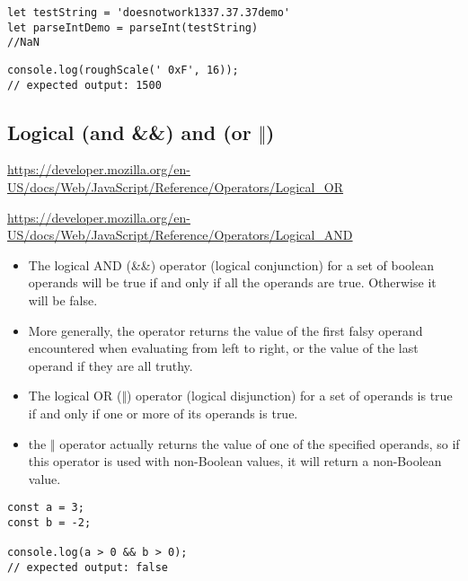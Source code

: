 \documentclass[10pt]{article}
\begin{document}
\begin{lstlisting}[title=Example parseInt() without numbers at start, captionpos=t]
let testString = 'doesnotwork1337.37.37demo'
let parseIntDemo = parseInt(testString)
//NaN
\end{lstlisting}

\begin{lstlisting}[title=Example parseInt() with radix 16, captionpos=t]
console.log(roughScale(' 0xF', 16));
// expected output: 1500
\end{lstlisting}

\medskip %



\medskip %
\pagebreak
\subsection{Logical (and \&\&) and (or	$\Vert$) }

\url{https://developer.mozilla.org/en-US/docs/Web/JavaScript/Reference/Operators/Logical_OR}

\medskip

\url{https://developer.mozilla.org/en-US/docs/Web/JavaScript/Reference/Operators/Logical_AND}


\begin{itemize}
	\item The logical AND (\&\&) operator (logical conjunction) for a set of boolean operands will be true if and only if all the operands are true. Otherwise it will be false.
	\item More generally, the operator returns the value of the first falsy operand encountered when evaluating from left to right, or the value of the last operand if they are all truthy.
	\item The logical OR ($\Vert$) operator (logical disjunction) for a set of operands is true if and only if one or more of its operands is true.
	\item the $\Vert$ operator actually returns the value of one of the specified operands, so if this operator is used with non-Boolean values, it will return a non-Boolean value.
\end{itemize}

\begin{lstlisting}[title=Example Logical AND \&\&, captionpos=t]
const a = 3;
const b = -2;

console.log(a > 0 && b > 0);
// expected output: false
\end{lstlisting}
\end{document}
